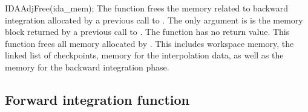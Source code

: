 {
  IDAAdjFree(ida\_mem);
}
{
  The function  frees the memory related to backward integration
  allocated by a previous call to .
}
{
  The only argument is  is the {\idas} memory block returned by a previous call 
  to .
}
{
  The function  has no return value.
}
{
  This function frees all memory allocated by . This includes workspace memory, 
  the linked list of checkpoints, memory for the interpolation data, as well as the {\idas} memory 
  for the backward integration phase.
}

\subsection{Forward integration function}
\label{sss:idasolvef}

